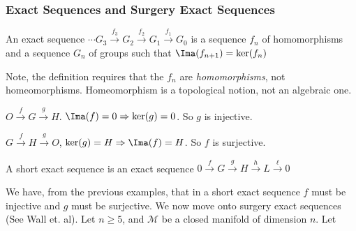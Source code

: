 \documentclass[crop=false,class=book,oneside]{standalone}
\begin{document}
            \subsubsection{%
                Exact Sequences and Surgery Exact Sequences
            }
                \begin{definition}
                    An exact sequence
                    $\cdots G_{3}%
                     \overset{f_{3}}{\rightarrow}G_{2}%
                     \overset{f_{2}}{\rightarrow}G_{1}%
                     \overset{f_{1}}{\rightarrow}G_{0}$
                    is a sequence $f_{n}$ of homomorphisms
                    and a sequence $G_{n}$ of groups such that
                    $\Ima(f_{n+1})=\ker(f_{n})$
                \end{definition}
                \begin{remark}
                    Note, the definition requires that the $f_{n}$
                    are \textit{homomorphisms}, not homeomorphisms.
                    Homeomorphism is a topological notion,
                    not an algebraic one.
                \end{remark}
                \begin{example}
                    $O\overset{f}{\rightarrow}G%
                     \overset{g}{\rightarrow}H$.
                    $\Ima(f)=0\Rightarrow\ker(g)=0$.
                    So $g$ is injective.
                \end{example}
                \begin{example}
                    $G\overset{f}{\rightarrow}%
                     H\overset{g}{\rightarrow}O$,
                    $\ker(g)=H\Rightarrow\Ima(f)=H$.
                    So $f$ is surjective.
                \end{example}
                \begin{definition}
                    A short exact sequence is an exact sequence
                    $0\overset{f}{\rightarrow}%
                     G\overset{g}{\rightarrow}%
                     H\overset{h}{\rightarrow}%
                     L\overset{\ell}{\rightarrow}0$
                \end{definition}
                We have, from the previous examples,
                that in a short exact sequence $f$ must be
                injective and $g$ must be surjective. We now
                move onto surgery exact sequences (See Wall et. al).
                Let $n\geq 5$, and $\mathcal{M}$ be a closed
                manifold of dimension $n$. Let
\end{document}
